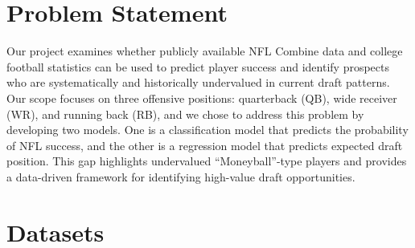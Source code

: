 \documentclass[11pt]{article}
\begin{document}
\section{Problem Statement}


Our project examines whether publicly available NFL Combine data and college football statistics can be used to predict player success and identify prospects who are systematically and historically undervalued in current draft patterns. Our scope focuses on three offensive positions: quarterback (QB), wide receiver (WR), and running back (RB), and we chose to address this problem by developing two models. One is a classification model that predicts the probability of NFL success, and the other is a regression model that predicts expected draft position. This gap highlights undervalued ``Moneyball''-type players and provides a data-driven framework for identifying high-value draft opportunities.



\section{Datasets}

\end{document}
